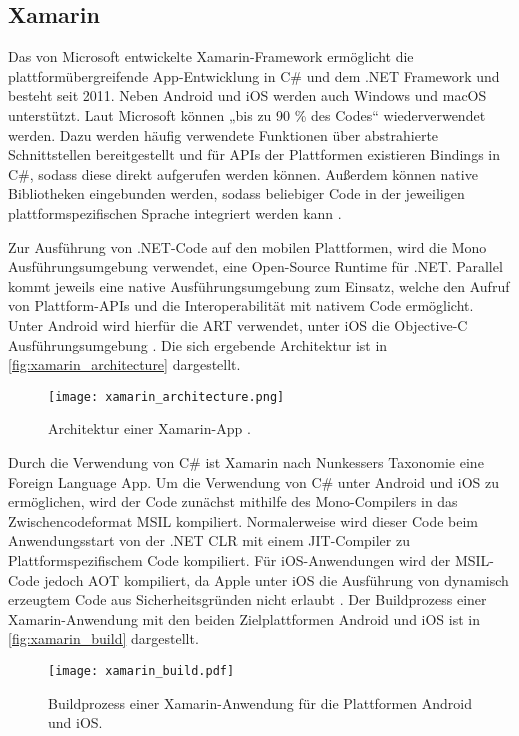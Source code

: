 \subsection{Xamarin}
\label{sec:frameworks_xamarin}

Das von Microsoft entwickelte Xamarin-Framework ermöglicht die plattformübergreifende App-Entwicklung in C\# und dem .NET Framework und besteht seit 2011.
Neben Android und iOS werden auch Windows und macOS unterstützt.
Laut Microsoft können „bis zu 90 \% des Codes“ \cite{Xamarin_Homepage} wiederverwendet werden.
Dazu werden häufig verwendete Funktionen über abstrahierte Schnittstellen bereitgestellt und für \acp{API} der Plattformen existieren Bindings in C\#, sodass diese direkt aufgerufen werden können.
Außerdem können native Bibliotheken eingebunden werden, sodass beliebiger Code in der jeweiligen plattformspezifischen Sprache integriert werden kann \cite{Xamarin_Android}.


Zur Ausführung von .NET-Code auf den mobilen Plattformen, wird die Mono Ausführungsumgebung verwendet, eine Open-Source Runtime für .NET.
Parallel kommt jeweils eine native Ausführungsumgebung zum Einsatz, welche den Aufruf von Plattform-\acp{API} und die Interoperabilität mit nativem Code ermöglicht.
Unter Android wird hierfür die \ac{ART} verwendet, unter iOS die Objective-C Ausführungsumgebung \cite{Xamarin_iOS,Xamarin_Android}.
Die sich ergebende Architektur ist in \autoref{fig:xamarin_architecture} dargestellt.
\begin{figure}[h]
    \centering
    \texttt{[image: xamarin\_architecture.png]}
    \caption{Architektur einer Xamarin-App \cite{Xamarin_Homepage}.}
    \label{fig:xamarin_architecture}
\end{figure}


Durch die Verwendung von C\# ist Xamarin nach Nunkessers Taxonomie \cite{Nunkesser_Taxonomy_Apps} eine Foreign Language App.
Um die Verwendung von C\# unter Android und iOS zu ermöglichen, wird der Code zunächst mithilfe des Mono-Compilers in das Zwischencodeformat \ac{MSIL} kompiliert.
Normalerweise wird dieser Code beim Anwendungsstart von der .NET \ac{CLR} mit einem \ac{JIT}-Compiler zu Plattformspezifischem Code kompiliert.
Für iOS-Anwendungen wird der \ac{MSIL}-Code jedoch \ac{AOT} kompiliert, da Apple unter iOS die Ausführung von dynamisch erzeugtem Code aus Sicherheitsgründen nicht erlaubt \cite{Xamarin_iOS}.
Der Buildprozess einer Xamarin-Anwendung mit den beiden Zielplattformen Android und iOS ist in \autoref{fig:xamarin_build} dargestellt.
\begin{figure}[h]
    \centering
    \texttt{[image: xamarin\_build.pdf]}
    \caption{Buildprozess einer Xamarin-Anwendung für die Plattformen Android und iOS.}
    \label{fig:xamarin_build}
\end{figure}


